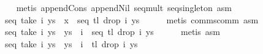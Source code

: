 \begin{isabellebody}
\ \ \ \ \isamarkupfalse%
\ {}metis\ append{}Cons\ append{}Nil\ seq{}mult\ seq{}singleton\ asm{}{}\isanewline
\ \ \isamarkupfalse%
\ \isamarkupfalse%
\ {}{}{}{}\ {}\ seq\ {}take\ i\ ys{}\ {}\ x\ {}\ seq\ {}tl\ {}drop\ i\ ys{}{}{}\isanewline
\ \ \ \ \isamarkupfalse%
\ {}metis\ comms{}comm\ asm{}{}\isanewline
\ \ \isamarkupfalse%
\ \isamarkupfalse%
\ {}{}{}{}\ {}\ seq\ {}take\ i\ ys{}\ {}\ ys\ {}\ i\ {}\ seq\ {}tl\ {}drop\ i\ ys{}{}{}\isanewline
\ \ \ \ \isamarkupfalse%
\ {}metis\ asm{}{}\isanewline
\ \ \isamarkupfalse%
\ \isamarkupfalse%
\ {}{}{}{}\ {}\ seq\ {}take\ i\ ys\ {}\ {}ys\ {}\ i{}\ {}\ tl\ {}drop\ i\ ys{}{}{}\isanewline

\end{isabellebody}
